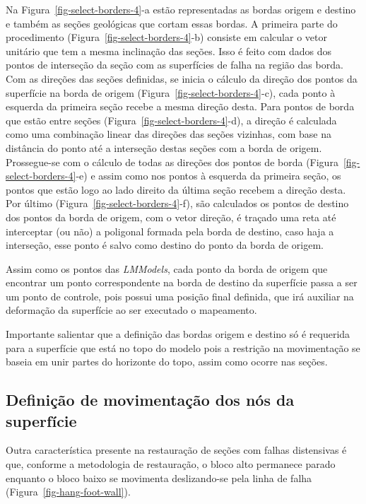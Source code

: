 Na Figura~\ref{fig-select-borders-4}-a estão representadas as bordas origem e destino e também as seções geológicas que cortam essas bordas. A primeira parte do procedimento (Figura~\ref{fig-select-borders-4}-b) consiste em calcular o vetor unitário que tem a mesma inclinação das seções. Isso é feito com dados dos pontos de interseção da seção com as superfícies de falha na região das borda. Com as direções das seções definidas, se inicia o cálculo da direção dos pontos da superfície na borda de origem (Figura~\ref{fig-select-borders-4}-c), cada ponto à esquerda da primeira seção recebe a mesma direção desta. Para pontos de borda que estão entre seções (Figura~\ref{fig-select-borders-4}-d), a direção é calculada como uma combinação linear das direções das seções vizinhas, com base na distância do ponto até a interseção destas seções com a borda de origem. Prossegue-se com o cálculo de todas as direções dos pontos de borda (Figura~\ref{fig-select-borders-4}-e) e assim como nos pontos à esquerda da primeira seção, os pontos que estão logo ao lado direito da última seção recebem a direção desta. Por último (Figura~\ref{fig-select-borders-4}-f), são calculados os pontos de destino dos pontos da borda de origem, com o vetor direção, é traçado uma reta até interceptar (ou não) a poligonal formada pela borda de destino, caso haja a interseção, esse ponto é salvo como destino do ponto da borda de origem.

Assim como os pontos das \textit{LMModels}, cada ponto da borda de origem que encontrar um ponto correspondente na borda de destino da superfície passa a ser um ponto de controle, pois possui uma posição final definida, que irá auxiliar na deformação da superfície ao ser executado o mapeamento.

Importante salientar que a definição das bordas origem e destino só é requerida para a superfície que está no topo do modelo pois a restrição na movimentação se baseia em unir partes do horizonte do topo, assim como ocorre nas seções.

\subsection{Definição de movimentação dos nós da superfície}

Outra característica presente na restauração de seções com falhas distensivas é que, conforme a metodologia de restauração, o bloco alto permanece parado enquanto o bloco baixo se movimenta deslizando-se pela linha de falha (Figura~\ref{fig-hang-foot-wall}).

